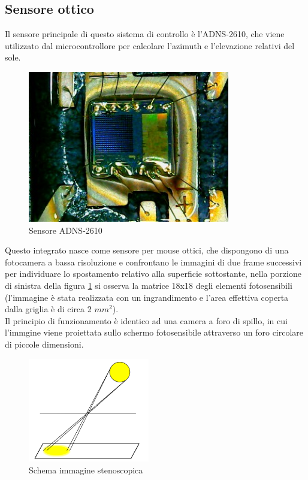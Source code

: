 \documentclass[12pt]{article}
\begin{document}
    
    \subsection{Sensore ottico}\label{optical_sensor}
    Il sensore principale di questo sistema di controllo è l'ADNS-2610, che viene utilizzato dal microcontrollore per calcolare l'azimuth e l'elevazione relativi del sole.\\
    
    \begin{figure}[h]
        \centering
        \includegraphics[width=250pt]{Draws/ADNS-2610_die/WIN_20210501_17_42_53_Pro.jpg}
        \caption{Sensore ADNS-2610}
        \label{fig:ADNS2610_die}
    \end{figure}
   
   
    Questo integrato nasce come sensore per mouse ottici, che dispongono di una fotocamera a bassa risoluzione e confrontano le immagini di due frame successivi per individuare lo spostamento relativo alla superficie sottostante, nella porzione di sinistra della figura \ref{fig:ADNS2610_die} si osserva la matrice 18x18 degli elementi fotosensibili (l'immagine è stata realizzata con un ingrandimento e l'area effettiva coperta dalla griglia è di circa 2 $mm^2$).\\
    Il principio di funzionamento è identico ad una camera a foro di spillo, in cui l'immgine viene proiettata sullo schermo fotosensibile attraverso un foro circolare di piccole dimensioni.
    
    \begin{figure}[h]
        \centering
        \includegraphics[width=150pt]{Draws/Pinhole_sun}
        \caption{Schema immagine stenoscopica}
        \label{fig:pinhole_sun}
    \end{figure}
    
\end{document}

